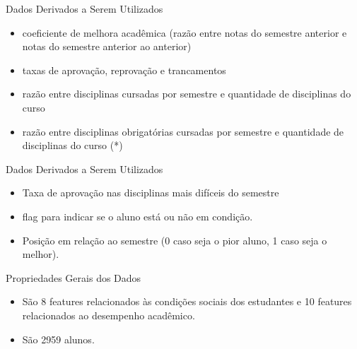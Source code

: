 \begin{frame}{Dados Derivados a Serem Utilizados}
    \begin{itemize}[itemsep=3ex]
        \item coeficiente de melhora acadêmica (razão entre notas do semestre
            anterior e notas do semestre anterior ao anterior) 
        \item taxas de aprovação, reprovação e trancamentos
        \item razão entre disciplinas cursadas por semestre e quantidade 
            de disciplinas do curso 
        \item razão entre disciplinas obrigatórias cursadas por semestre e quantidade 
            de disciplinas do curso (*)
    \end{itemize}
\end{frame}

\begin{frame}{Dados Derivados a Serem Utilizados}
    \begin{itemize}[itemsep=3ex]
        \item Taxa de aprovação nas disciplinas mais difíceis do semestre
        \item flag para indicar se o aluno está ou não em condição.
        \item Posição em relação ao semestre (0 caso seja o pior aluno, 1 caso seja o
            melhor).
    \end{itemize}
\end{frame}

\begin{frame}{Propriedades Gerais dos Dados}
    \begin{itemize}[itemsep=3ex]
        \item São 8 features relacionados às condições sociais dos estudantes e 10
            features relacionados ao desempenho acadêmico.
        \item São 2959 alunos.  
    \end{itemize}
\end{frame}


